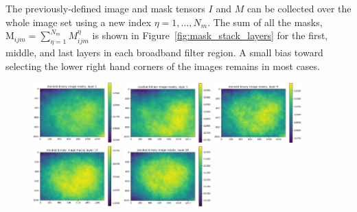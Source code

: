 \documentclass[letterpaper,11pt]{article}
\newcommand{\reffig}[1]{Figure~\ref{#1}}
\newcommand{\Mu}{\mathrm{M}}
\begin{document}
The previously-defined image and mask tensors $I$ and $M$ can be collected over the whole image set using a new index $\eta=1,\ldots,N_{m}$. The sum of all the masks, $\Mu_{ijm} = \sum_{\eta=1}^{N_{m}} M^{\eta}_{ijm}$ is shown in \reffig{fig:mask_stack_layers} for the first, middle, and last layers in each broadband filter region. A small bias toward selecting the lower right hand corners of the images remains in most cases. 

\begin{figure}[!ht]
\centering
\includegraphics[width=0.3\textwidth]{images/measuring_flatfield_corrections/mask_stack_layers/mask_stack_layer_1}
\includegraphics[width=0.3\textwidth]{images/measuring_flatfield_corrections/mask_stack_layers/mask_stack_layer_5}
\includegraphics[width=0.3\textwidth]{images/measuring_flatfield_corrections/mask_stack_layers/mask_stack_layer_9}
\includegraphics[width=0.3\textwidth]{images/measuring_flatfield_corrections/mask_stack_layers/mask_stack_layer_10}
\includegraphics[width=0.3\textwidth]{images/measuring_flatfield_corrections/mask_stack_layers/mask_stack_layer_14}

\end{figure}
\end{document}
